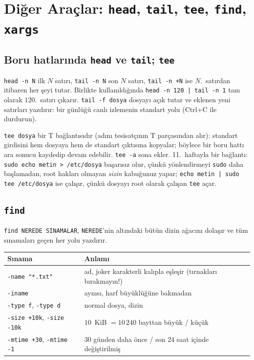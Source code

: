 \documentclass[11pt,a4paper]{article}
\newcommand{\cmd}[1]{\texttt{#1}}
\begin{document}
\section{Diğer Araçlar: \texttt{head}, \texttt{tail}, \texttt{tee}, \texttt{find}, \texttt{xargs}}
\label{sec:more}

\subsection{Boru hatlarında \texttt{head} ve \texttt{tail}; \texttt{tee}}



\cmd{head -n N} ilk $N$ satırı, \cmd{tail -n N} son $N$ satırı, \cmd{tail -n +N} ise $N$.~satırdan itibaren her şeyi tutar. Birlikte kullanıldığında \cmd{head -n 120 | tail -n 1} tam olarak $120$.~satırı çıkarır. \cmd{tail -f dosya} dosyayı açık tutar ve eklenen yeni satırları yazdırır: bir günlüğü canlı izlemenin standart yolu (Ctrl+C ile durdurun).

\cmd{tee dosya} bir T bağlantısıdır (adını tesisatçının T parçasından alır): standart girdisini hem dosyaya hem de standart çıktısına kopyalar; böylece bir boru hattı ara sonucu kaydedip devam edebilir. \cmd{tee -a} sona ekler. 11.~haftayla bir bağlantı: \cmd{sudo echo metin > /etc/dosya} başarısız olur, çünkü yönlendirmeyi \cmd{sudo} daha başlamadan, root hakları olmayan \emph{sizin} kabuğunuz yapar; \cmd{echo metin | sudo tee /etc/dosya} ise çalışır, çünkü dosyayı root olarak çalışan \cmd{tee} açar.

\subsection{\texttt{find}}

\cmd{find NEREDE SINAMALAR}, \texttt{NEREDE}'nin altındaki bütün dizin ağacını dolaşır ve tüm sınamaları geçen her yolu yazdırır.



\begin{center}
\renewcommand{\arraystretch}{1.2}
\begin{tabular}{@{}lp{10.5cm}@{}}
\toprule
\textbf{Sınama} & \textbf{Anlamı}\\
\midrule
\cmd{-name "*.txt"} & ad, joker karakterli kalıpla eşleşir (tırnakları bırakmayın!)\\
\cmd{-iname} & aynısı, harf büyüklüğüne bakmadan\\
\cmd{-type f}, \cmd{-type d} & normal dosya, dizin\\
\cmd{-size +10k}, \cmd{-size -10k} & $10$~KiB $= 10\,240$ bayttan büyük / küçük\\
\cmd{-mtime +30}, \cmd{-mtime -1} & $30$ günden daha önce / son $24$ saat içinde değiştirilmiş\\
\bottomrule
\end{tabular}
\end{center}
\end{document}
